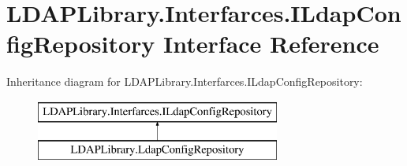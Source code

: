 \hypertarget{interface_l_d_a_p_library_1_1_interfarces_1_1_i_ldap_config_repository}{}\section{L\+D\+A\+P\+Library.\+Interfarces.\+I\+Ldap\+Config\+Repository Interface Reference}
\label{interface_l_d_a_p_library_1_1_interfarces_1_1_i_ldap_config_repository}
Inheritance diagram for L\+D\+A\+P\+Library.\+Interfarces.\+I\+Ldap\+Config\+Repository\+:\begin{figure}[H]
\begin{center}
\leavevmode
\includegraphics[height=2.000000cm]{interface_l_d_a_p_library_1_1_interfarces_1_1_i_ldap_config_repository}
\end{center}
\end{figure}
